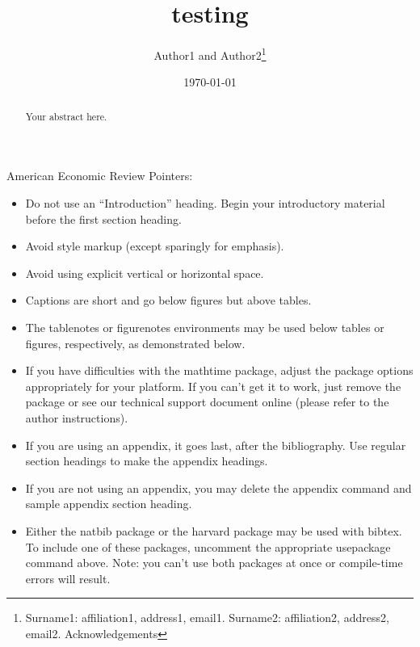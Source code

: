 \documentclass[AER]{AEA}
\begin{document}
\title{testing}
\author{Author1 and Author2\thanks{Surname1: affiliation1, address1, email1. 
Surname2: affiliation2, address2, email2. Acknowledgements}}
\date{\today}
\JEL{}
\Keywords{}

\begin{abstract}
Your abstract here.
\end{abstract}


\maketitle

American Economic Review Pointers:

\begin{itemize}
\item Do not use an ``Introduction'' heading. Begin your introductory material
before the first section heading.

\item Avoid style markup (except sparingly for emphasis).

\item Avoid using explicit vertical or horizontal space.

\item Captions are short and go below figures but above tables.

\item The tablenotes or figurenotes environments may be used below tables
or figures, respectively, as demonstrated below.

\item If you have difficulties with the mathtime package, adjust the package
options appropriately for your platform. If you can't get it to work, just
remove the package or see our technical support document online (please
refer to the author instructions).

\item If you are using an appendix, it goes last, after the bibliography.
Use regular section headings to make the appendix headings.

\item If you are not using an appendix, you may delete the appendix command
and sample appendix section heading.

\item Either the natbib package or the harvard package may be used with bibtex.
To include one of these packages, uncomment the appropriate usepackage command
above. Note: you can't use both packages at once or compile-time errors will result.

\end{itemize}
\end{document}
